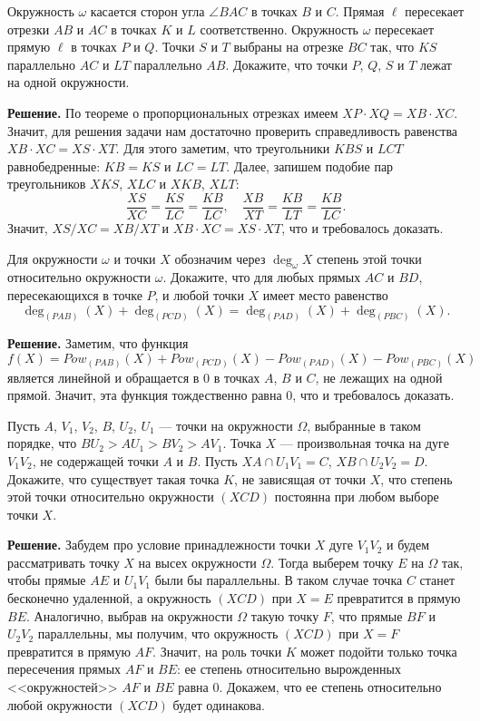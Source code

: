  Окружность $\omega$ касается сторон угла $\angle BAC$ в точках $B$ и $C$. Прямая $\ell$ пересекает отрезки $AB$ и $AC$ в точках $K$ и $L$ соответственно. Окружность $\omega$ пересекает прямую $\ell$ в точках $P$ и $Q$. Точки $S$ и $T$ выбраны на отрезке $BC$ так, что $KS$ параллельно $AC$ и $LT$ параллельно $AB$. Докажите, что точки $P$, $Q$, $S$ и $T$ лежат на одной окружности.

\textbf{Решение.} По теореме о пропорциональных отрезках имеем $XP\cdot XQ=XB\cdot XC$. Значит, для решения задачи нам достаточно проверить справедливость равенства $XB\cdot XC=XS\cdot XT$. Для этого заметим, что треугольники $KBS$ и $LCT$ равнобедренные: $KB=KS$ и $LC=LT$. Далее, запишем подобие пар треугольников $XKS$, $XLC$ и $XKB$, $XLT$: $$\frac{XS}{XC}=\frac{KS}{LC}=\frac{KB}{LC}, \quad \frac{XB}{XT}=\frac{KB}{LT}=\frac{KB}{LC}.$$ Значит, $XS/XC=XB/XT$ и $XB\cdot XC=XS\cdot XT$, что и требовалось доказать.

Для окружности $\omega$ и точки $X$ обозначим через $\deg_\omega X$ степень этой точки относительно окружности $\omega$. Докажите, что для любых прямых $AC$ и $BD$, пересекающихся в точке $P$, и любой точки $X$ имеет место равенство $$\deg_{(PAB)}(X)+\deg_{(PCD)}(X)=\deg_{(PAD)}(X)+\deg_{(PBC)}(X).$$

\textbf{Решение.} Заметим, что функция $$f(X)=Pow_{(PAB)}(X)+Pow_{(PCD)}(X)-Pow_{(PAD)}(X)-Pow_{(PBC)}(X)$$ является линейной и обращается в 0 в точках $A$, $B$ и $C$, не лежащих на одной прямой. Значит, эта функция тождественно равна 0, что и требовалось доказать.

 Пусть $A$, $V_1$, $V_2$, $B$, $U_2$, $U_1$ --- точки на окружности $\Omega$, выбранные в таком порядке, что $BU_2>AU_1>BV_2>AV_1$. Точка $X$ --- произвольная точка на дуге $V_1V_2$, не содержащей точки $A$ и $B$. Пусть $XA\cap U_1V_1=C$, $XB\cap U_2V_2=D$. Докажите, что существует такая точка $K$, не зависящая от точки $X$, что степень этой точки относительно окружности $(XCD)$ постоянна при любом выборе точки $X$.

\textbf{Решение.} Забудем про условие принадлежности точки $X$ дуге $V_1V_2$ и будем рассматривать точку $X$ на высех окружности $\Omega$. Тогда выберем точку $E$ на $\Omega$ так, чтобы прямые $AE$ и $U_1V_1$ были бы параллельны. В таком случае точка $C$ станет бесконечно удаленной, а окружность $(XCD)$ при $X=E$ превратится в прямую $BE$. Аналогично, выбрав на окружности $\Omega$ такую точку $F$, что прямые $BF$ и $U_2V_2$ параллельны, мы получим, что окружность $(XCD)$ при $X=F$ превратится в прямую $AF$. Значит, на роль точки $K$ может подойти только точка пересечения прямых $AF$ и $BE$: ее степень относительно вырожденных <<окружностей>> $AF$ и $BE$ равна 0. Докажем, что ее степень относительно любой окружности $(XCD)$ будет одинакова.

